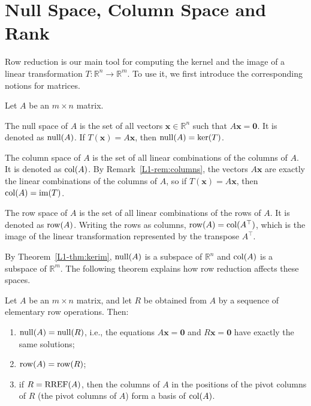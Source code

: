 \section{Null Space, Column Space and Rank}\label{L1-sec:rank}

Row reduction is our main tool for computing the kernel and the image of a linear transformation $T: \mathbb{R}^n \to \mathbb{R}^m$. To use it, we first introduce the corresponding notions for matrices.

\begin{definition}
    Let $A$ be an $m \times n$ matrix.

    The null space of $A$ is the set of all vectors $\mathbf{x} \in \mathbb{R}^n$ such that $A\mathbf{x} = \mathbf{0}$. It is denoted as $\operatorname{null}(A)$. If $T(\mathbf{x}) = A\mathbf{x}$, then $\operatorname{null}(A) = \ker(T)$.

    The column space of $A$ is the set of all linear combinations of the columns of $A$. It is denoted as $\operatorname{col}(A)$. By Remark~\ref{L1-rem:columns}, the vectors $A\mathbf{x}$ are exactly the linear combinations of the columns of $A$, so if $T(\mathbf{x}) = A\mathbf{x}$, then $\operatorname{col}(A) = \operatorname{im}(T)$.

    The row space of $A$ is the set of all linear combinations of the rows of $A$. It is denoted as $\operatorname{row}(A)$. Writing the rows as columns, $\operatorname{row}(A) = \operatorname{col}(A^\top)$, which is the image of the linear transformation represented by the transpose $A^\top$.
\end{definition}

By Theorem~\ref{L1-thm:kerim}, $\operatorname{null}(A)$ is a subspace of $\mathbb{R}^n$ and $\operatorname{col}(A)$ is a subspace of $\mathbb{R}^m$. The following theorem explains how row reduction affects these spaces.

\begin{theorem}\label{L1-thm:rowops}
    Let $A$ be an $m \times n$ matrix, and let $R$ be obtained from $A$ by a sequence of elementary row operations. Then:
    \begin{enumerate}
        \item $\operatorname{null}(A) = \operatorname{null}(R)$, i.e., the equations $A\mathbf{x} = \mathbf{0}$ and $R\mathbf{x} = \mathbf{0}$ have exactly the same solutions;
        \item $\operatorname{row}(A) = \operatorname{row}(R)$;
        \item if $R = \operatorname{RREF}(A)$, then the columns of $A$ in the positions of the pivot columns of $R$ (the pivot columns of $A$) form a basis of $\operatorname{col}(A)$.
    \end{enumerate}
\end{theorem}


